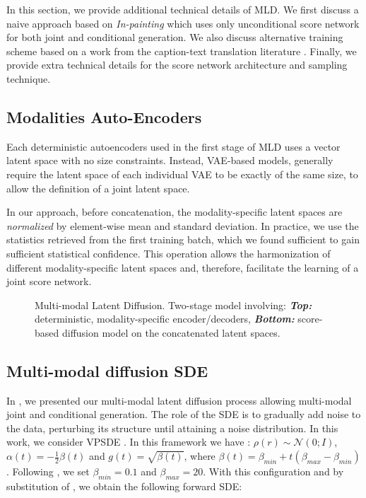

In this section, we provide additional technical details of \gls{MLD}. We first discuss a naive approach based on \textit{In-painting} which uses only unconditional score network for both joint and conditional generation.
We also discuss alternative training scheme based on a work from the caption-text translation literature \cite{bao2023transformer}. Finally, we provide extra technical details for the score network architecture and sampling technique.

\subsection{Modalities Auto-Encoders} 
Each deterministic autoencoders used in the first stage of \gls{MLD} uses a vector latent space with no size constraints. Instead, \gls{VAE}-based models, generally require the latent space of each individual \gls{VAE} to be exactly of the same size, to allow the definition of a joint latent space.

In our approach, before concatenation, the modality-specific latent spaces are \textit{normalized} by element-wise mean and standard deviation. In practice, we use the statistics retrieved from the first training batch, which we found sufficient to gain sufficient statistical confidence.
This operation allows the harmonization of different modality-specific latent spaces and, therefore, facilitate the learning of a joint score network.




\begin{figure}[H]
    \centering
    
    \caption{Multi-modal Latent Diffusion. Two-stage model involving: \textbf{  \textit{Top:} }deterministic, modality-specific encoder/decoders, \textbf{ \textit{Bottom:} } score-based diffusion model on the concatenated latent spaces.}
    \label{fig:my_label}
\end{figure}

\subsection{Multi-modal diffusion SDE}

In , we presented our multi-modal latent diffusion process allowing multi-modal joint and conditional  generation. The role of the  \gls{SDE} is to gradually add noise to the data, perturbing its structure until attaining a noise distribution. 
In this work, we consider \gls{VPSDE} \cite{Song2020}. In this framework we have : $\rho(r) \sim \mathcal{N}(0;I) $,   $\alpha(t) = -\frac{1}{2}\beta(t) $ and $g(t) = \sqrt{\beta(t)}$, where $  \beta(t)  = \beta_{min} + t ( \beta_{max} - \beta_{min} )$. Following \citep{ho2020denoising,Song2020}, we set $\beta_{min} = 0.1 $ and $\beta_{max} = 20$.
With this configuration and by substitution of , we obtain the following forward \gls{SDE}:




